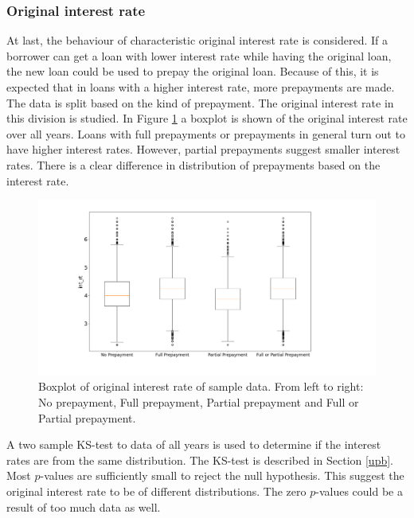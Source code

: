 \subsubsection{Original interest rate}
    At last, the behaviour of characteristic original interest rate is 
    considered. If a borrower can get a loan with lower interest
    rate while having the original loan, the new loan could be used
    to prepay the original loan. Because of this, it is expected
    that in loans with a higher interest
    rate, more prepayments are made. 
    The data is split based on the kind of prepayment. The original interest rate in this division is studied. In Figure \ref{model_boxplot_int_rt} a boxplot is shown of the original interest rate over all years. Loans with full prepayments or prepayments in general turn out to have higher interest rates. However, partial prepayments suggest smaller interest rates. There is a clear difference in distribution of prepayments based on the interest rate. 
    \begin{figure}[H]
        \centering
        \includegraphics[width=\linewidth]{Figures/Boxplot_of_int_rt_[2013, 2014, 2015, 2016, 2017, 2018, 2019, 2020]_.png}
        \caption{
            Boxplot of original interest rate of sample data. 
            From left to right: No prepayment, Full prepayment, 
            Partial prepayment and Full or Partial prepayment.
            }
        \label{model_boxplot_int_rt}
    \end{figure}
    A two sample KS-test to data of all years is used to determine if the interest rates are from the same distribution. The KS-test is described in Section \ref{upb}. Most $p$-values are sufficiently small to reject the null hypothesis. This suggest the original interest rate to be of different distributions. 
    The zero $p$-values could be a result of too much data as well.
